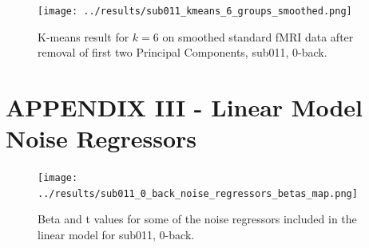 \documentclass[11pt]{article}
\begin{document}
\begin{figure}[H]
\centering
\texttt{[image: ../results/sub011\_kmeans\_6\_groups\_smoothed.png]}
\caption{K-means result for $k=6$ on smoothed standard fMRI data after removal of first two Principal Components, sub011, 0-back.}
\end{figure} 

\section{APPENDIX III - Linear Model Noise Regressors}

\begin{figure}[H]
\centering
\texttt{[image: ../results/sub011\_0\_back\_noise\_regressors\_betas\_map.png]}
\caption{Beta and t values for some of the noise regressors included in the linear model for sub011, 0-back.}
\end{figure} 
\end{document}
